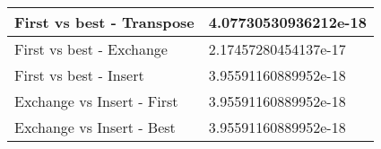 \documentclass[a4paper]{article}
\begin{document}
\begin{tabular}{|l|l|}
\hline
First vs best - Transpose&4.07730530936212e-18\\
\hline
First vs best - Exchange&2.17457280454137e-17\\
\hline
First vs best - Insert&3.95591160889952e-18\\
\hline
Exchange vs Insert - First&3.95591160889952e-18\\
\hline
Exchange vs Insert - Best&3.95591160889952e-18\\
\hline
\end{tabular}
\end{document}
